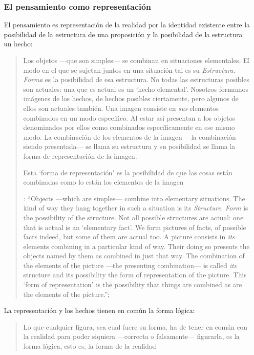 \subsubsection{El pensamiento como representación}

El pensamiento es representación de la realidad por la identidad existente entre la posibilidad de la estructura de una proposición y la posibilidad de la estructura un hecho: \blockquote[{\cite[171]{anscombe2011plato:simplicity}}: \enquote{Objects ---which are simples--- combine into elementary situations. The kind of way they hang together in such a situation is its \emph{Structure}. \emph{Form} is the possibility of the structure. Not all possible structures are actual: one that is actual is an `elementary fact'. We form pictures of facts, of possible facts indeed, but some of them are actual too. A picture consists in \emph{its} elements combining in a particular kind of way. Their doing so presents the objects named by them as combined in just that way. The combination of the elements of the picture ---the presenting combination--- is called \emph{its} structure and its possibility the form of representation of the picture. This `form of representation' is the possibility that things are combined as are the elements of the picture.}; {\cite[Cf.~][\S2.15]{wittgenstein1922tractatuses}}]{Los objetos ---que son simples--- se combinan en situaciones elementales. El modo en el que se sujetan juntos en una situación tal es su \emph{Estructura}. \emph{Forma} es la posibilidad de esa estructura. No todas las estructuras posibles son actuales: una que es actual es un `hecho elemental'. Nosotros formamos imágenes de los hechos, de hechos posibles ciertamente, pero algunos de ellos son actuales también. Una imagen consiste en \emph{sus} elementos combinados en un modo específico. Al estar así presentan a los objetos denominados por ellos como combinados específicamente en ese mismo modo. La combinación de los elementos de la imagen ---la combinación siendo presentada--- se llama su estructura y su posibilidad se llama la forma de representación de la imagen.

Esta `forma de representación' es la posibilidad de que las cosas están combinadas como lo están los elementos de la imagen}.

La representación y los hechos tienen en común la forma lógica: \blockquote[{\cite[\S2.18]{wittgenstein1922tractatuses}}]{Lo que cualquier figura, sea cual fuere su forma, ha de tener en común con la realidad para poder siquiera ---correcta o falsamente--- figurarla, es la forma lógica, esto es, la forma de la realidad}.

